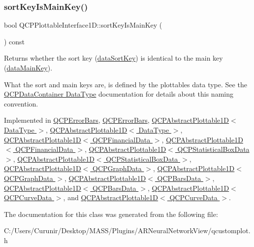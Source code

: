 \subsubsection{\texorpdfstring{sort\+Key\+Is\+Main\+Key()}{sortKeyIsMainKey()}}
{\footnotesize\ttfamily bool Q\+C\+P\+Plottable\+Interface1\+D\+::sort\+Key\+Is\+Main\+Key (\begin{DoxyParamCaption}{ }\end{DoxyParamCaption}) const\hspace{0.3cm}{\ttfamily [pure virtual]}}

Returns whether the sort key (\hyperlink{class_q_c_p_plottable_interface1_d_afdc92f9f01e7e35f2e96b2ea9dc14ae7}{data\+Sort\+Key}) is identical to the main key (\hyperlink{class_q_c_p_plottable_interface1_d_a2bd60daaac046945fead558cbd83cf73}{data\+Main\+Key}).

What the sort and main keys are, is defined by the plottable\textquotesingle{}s data type. See the \hyperlink{class_q_c_p_data_container_qcpdatacontainer-datatype}{Q\+C\+P\+Data\+Container Data\+Type} documentation for details about this naming convention. 

Implemented in \hyperlink{class_q_c_p_error_bars_aa00fcef7b0cb5c54bafe32ab4b16e674}{Q\+C\+P\+Error\+Bars}, \hyperlink{class_q_c_p_error_bars_a2e5264bcd56e516d2ce0e1bdbccb4e6c}{Q\+C\+P\+Error\+Bars}, \hyperlink{class_q_c_p_abstract_plottable1_d_a022e8905f5a667d8379493d6a037e79f}{Q\+C\+P\+Abstract\+Plottable1\+D$<$ Data\+Type $>$}, \hyperlink{class_q_c_p_abstract_plottable1_d_aa4a61e7fc79f1b71ff660db53c92efd2}{Q\+C\+P\+Abstract\+Plottable1\+D$<$ Data\+Type $>$}, \hyperlink{class_q_c_p_abstract_plottable1_d_a022e8905f5a667d8379493d6a037e79f}{Q\+C\+P\+Abstract\+Plottable1\+D$<$ Q\+C\+P\+Financial\+Data $>$}, \hyperlink{class_q_c_p_abstract_plottable1_d_aa4a61e7fc79f1b71ff660db53c92efd2}{Q\+C\+P\+Abstract\+Plottable1\+D$<$ Q\+C\+P\+Financial\+Data $>$}, \hyperlink{class_q_c_p_abstract_plottable1_d_a022e8905f5a667d8379493d6a037e79f}{Q\+C\+P\+Abstract\+Plottable1\+D$<$ Q\+C\+P\+Statistical\+Box\+Data $>$}, \hyperlink{class_q_c_p_abstract_plottable1_d_aa4a61e7fc79f1b71ff660db53c92efd2}{Q\+C\+P\+Abstract\+Plottable1\+D$<$ Q\+C\+P\+Statistical\+Box\+Data $>$}, \hyperlink{class_q_c_p_abstract_plottable1_d_a022e8905f5a667d8379493d6a037e79f}{Q\+C\+P\+Abstract\+Plottable1\+D$<$ Q\+C\+P\+Graph\+Data $>$}, \hyperlink{class_q_c_p_abstract_plottable1_d_aa4a61e7fc79f1b71ff660db53c92efd2}{Q\+C\+P\+Abstract\+Plottable1\+D$<$ Q\+C\+P\+Graph\+Data $>$}, \hyperlink{class_q_c_p_abstract_plottable1_d_a022e8905f5a667d8379493d6a037e79f}{Q\+C\+P\+Abstract\+Plottable1\+D$<$ Q\+C\+P\+Bars\+Data $>$}, \hyperlink{class_q_c_p_abstract_plottable1_d_aa4a61e7fc79f1b71ff660db53c92efd2}{Q\+C\+P\+Abstract\+Plottable1\+D$<$ Q\+C\+P\+Bars\+Data $>$}, \hyperlink{class_q_c_p_abstract_plottable1_d_a022e8905f5a667d8379493d6a037e79f}{Q\+C\+P\+Abstract\+Plottable1\+D$<$ Q\+C\+P\+Curve\+Data $>$}, and \hyperlink{class_q_c_p_abstract_plottable1_d_aa4a61e7fc79f1b71ff660db53c92efd2}{Q\+C\+P\+Abstract\+Plottable1\+D$<$ Q\+C\+P\+Curve\+Data $>$}.



The documentation for this class was generated from the following file\+:\begin{DoxyCompactItemize}
\item 
C\+:/\+Users/\+Curunir/\+Desktop/\+M\+A\+S\+S/\+Plugins/\+A\+R\+Neural\+Network\+View/qcustomplot.\+h\end{DoxyCompactItemize}
